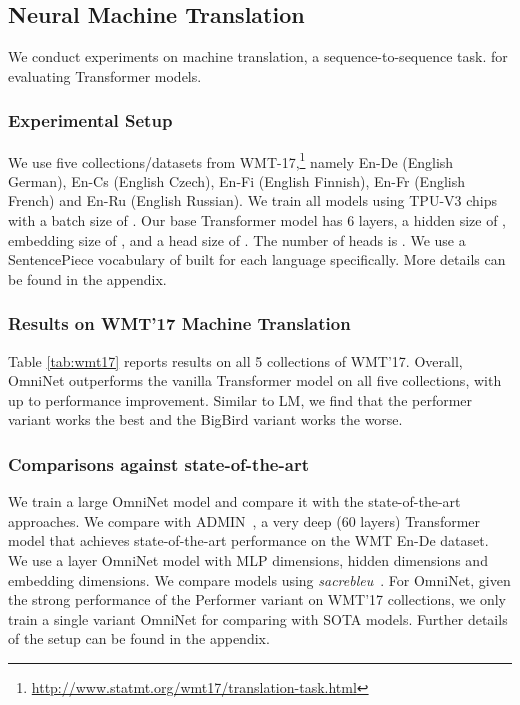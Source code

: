 \documentclass{article}
\begin{document}
\subsection{Neural Machine Translation}
We conduct experiments on machine translation, a sequence-to-sequence task. for evaluating Transformer models. 
\subsubsection{Experimental Setup} 
We use five collections/datasets from WMT-17,\footnote{\url{http://www.statmt.org/wmt17/translation-task.html}} namely En-De (English  German), En-Cs (English  Czech), En-Fi (English  Finnish), En-Fr (English  French) and En-Ru (English  Russian). We train all models using  TPU-V3 chips with a batch size of . Our base Transformer model has 6 layers, a hidden size of , embedding size of , and a head size of . The number of heads is . We use a SentencePiece \citep{kudo2018sentencepiece} vocabulary of  built for each language specifically. More details can be found in the appendix.


\subsubsection{Results on WMT'17 Machine Translation}
Table \ref{tab:wmt17} reports results on all 5 collections of WMT'17. Overall, OmniNet outperforms the vanilla Transformer model on all five collections, with up to  performance improvement. Similar to LM, we find that the performer variant works the best and the BigBird variant works the worse.
\subsubsection{Comparisons against state-of-the-art} We train a large OmniNet model and compare it with the state-of-the-art approaches. We compare with ADMIN~\citep{liu2020very}, a very deep (60 layers) Transformer model that achieves state-of-the-art performance on the WMT En-De dataset. We use a  layer OmniNet model with  MLP dimensions,  hidden dimensions and embedding dimensions. We compare models using \textit{sacrebleu}~\citep{post2018call}. For OmniNet, given the strong performance of the Performer variant on WMT'17 collections, we only train a single  variant OmniNet for comparing with SOTA models. Further details of the setup can be found in the appendix.
\end{document}
